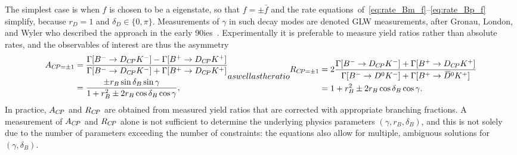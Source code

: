 The simplest case is when $f$ is chosen to be a \CP eigenstate, so that $f=\pm\bar f$ and the rate equations~of~\eqref{eq:rate_Bm_f}--\eqref{eq:rate_Bp_f} simplify, because $r_D=1$ and $\delta_D\in\{0,\pi\}$. Measurements of $\gamma$ in such decay modes are denoted GLW measurements, after  Gronau, London, and Wyler who described the approach in the early 90ies~\cite{gronauDeterminingWeakPhase1991,gronauHowDetermineAll1991}. Experimentally it is preferable to measure yield ratios rather than absolute rates, and the observables of interest are thus the \CP asymmetry
\begin{subequations}\label{eq:GLW_observables}
\begin{align}
\begin{split}
    A_{\CP=\pm1} &= \frac{\Gamma[\Bm\to D_{\CP}\Km] - \Gamma[\Bp\to D_{\CP}\Kp]}{\Gamma[\Bm\to D_{\CP}\Km] + \Gamma[\Bp\to D_{\CP}\Kp]} \\
    &= \frac{\pm r_B \sin \delta_B \sin \gamma}{1 + r_B^2 \pm 2 r_B \cos \delta_B \cos \gamma},
\end{split}
\end{align}
as well as the ratio
\begin{align}
\begin{split}
    R_{\CP=\pm 1} &= 2\frac{\Gamma[\Bm\to D_{\CP}\Km] + \Gamma[\Bp\to D_{\CP}\Kp]}{\Gamma[\Bm\to \Dz\Km] + \Gamma[\Bp\to \Dzb\Kp]} \\
    &=  1 + r_B^2 \pm 2 r_B \cos \delta_B \cos \gamma.
\end{split}
\end{align}
\end{subequations}
In practice, $A_{{C\!P}}$ and $R_{{C\!P}}$ are obtained from measured yield ratios that are corrected with appropriate branching fractions. A measurement of $A_{{C\!P}}$ and $R_{{C\!P}}$ alone is not sufficient to determine the underlying physics parameters $(\gamma, r_B, \delta_B)$, and this is not solely due to the number of parameters exceeding the number of constraints: the equations also allow for multiple, ambiguous solutions for $(\gamma, \delta_B)$. 
